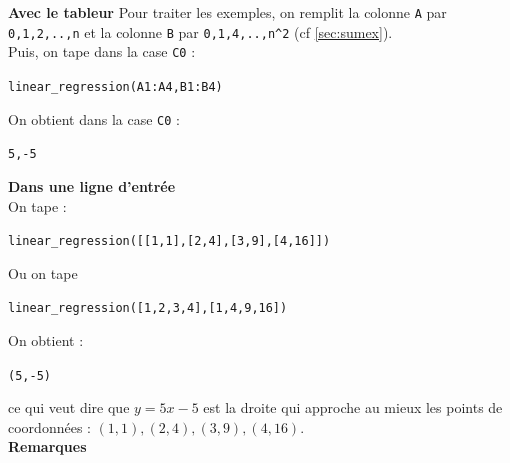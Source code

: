 \documentclass[a4paper,11pt]{book}
\begin{document}
{\bf Avec le tableur}
Pour traiter les exemples,  on remplit la colonne {\tt A} par 
{\tt 0,1,2,..,n} et la colonne 
{\tt B} par {\tt 0,1,4,..,n\verb|^|2} (cf \ref{sec:sumex}).\\  
Puis, on tape dans la case {\tt C0} :
\begin{center}{\tt linear\_regression(A1:A4,B1:B4)}\end{center}
On obtient dans la case {\tt C0} :
\begin{center}{\tt 5,-5 }\end{center}
{\bf Dans une ligne d'entr\'ee}\\
On tape :
\begin{center}{\tt linear\_regression([[1,1],[2,4],[3,9],[4,16]])}\end{center}
Ou on tape\begin{center}{\tt linear\_regression([1,2,3,4],[1,4,9,16])}\end{center}
On obtient :
\begin{center}{\tt (5,-5) }\end{center}
ce qui veut dire que $y=5x-5$ est la droite qui approche au mieux les points 
de coordonn\'ees : $(1,1),(2,4),(3,9),(4,16)$.\\
{\bf Remarques}
\end{document}
